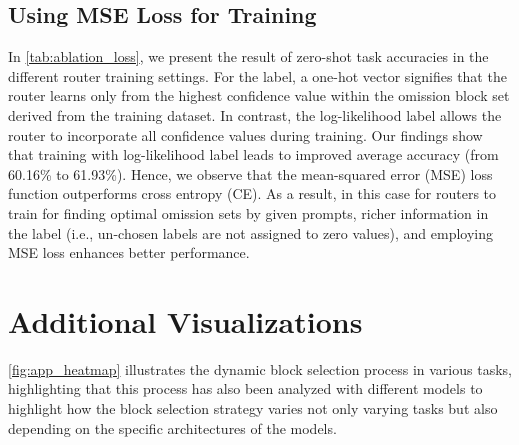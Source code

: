 \subsection{Using MSE Loss for Training}\label{app:ssec_loss}



In \cref{tab:ablation_loss}, we present the result of zero-shot task accuracies in the different router training settings. For the label, a one-hot vector signifies that the router learns only from the highest confidence value within the omission block set derived from the training dataset. In contrast, the log-likelihood label allows the router to incorporate all confidence values during training. Our findings show that training with log-likelihood label leads to improved average accuracy (from 60.16\% to 61.93\%). Hence, we observe that the mean-squared error (MSE) loss function outperforms cross entropy (CE). As a result, in this case for routers to train for finding optimal omission sets by given prompts, richer information in the label (i.e., un-chosen labels are not assigned to zero values), and employing MSE loss enhances better performance.

\clearpage

\section{Additional Visualizations}\label{app:visualization}

\cref{fig:app_heatmap} illustrates the dynamic block selection process in various tasks, highlighting that this process has also been analyzed with different models to highlight how the block selection strategy varies not only varying tasks but also depending on the specific architectures of the models.


